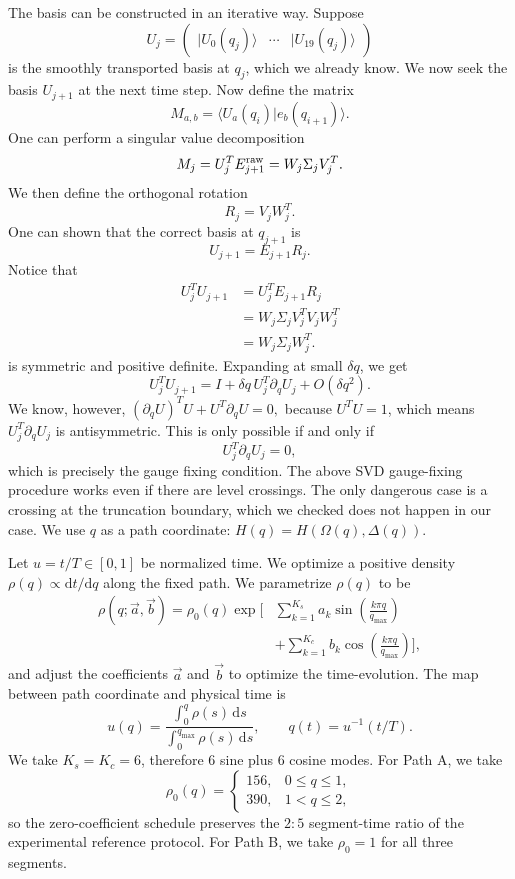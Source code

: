 \documentclass[a4paper,11pt]{article}
\newcommand{\dd}{\mathrm{d}}
\theoremstyle{remark}
\theoremstyle{theorem}
\begin{document}
The basis can be constructed in an iterative way. Suppose \[U_j=
\begin{pmatrix}
|U_0(q_j)\rangle&
\cdots&
|U_{19}(q_j)\rangle
\end{pmatrix}\]
is the smoothly transported basis at $q_j$, which we already know. We now seek the basis $U_{j+1}$ at the next time step. Now define the matrix 
$$
M_{a,b}=\langle U_a (q_{i})| e_b (q_{i+1}) \rangle .
$$
One can perform a singular value decomposition 
$$
M_j=U_j^T E_{j+1}^{\rm raw}=W_j\Sigma_jV_j^T.
$$
We then define the orthogonal rotation
\[
R_j=V_jW_j^T.
\]
One can shown that the correct basis at $q_{j+1}$ is 
\begin{equation}
U_{j+1}=E_{j+1}R_j. 
\end{equation}
Notice that 
\begin{align}
U_j^T U_{j+1} &=U_j^T E_{j+1} R_j  \nonumber \\
&=W_j\Sigma_j V_j^T V_j  W_j^T \nonumber \\
&=W_j\Sigma_jW_j^T. \nonumber
\end{align}
is symmetric and positive definite.
Expanding at small \(\delta q\), we get
\[
U_j^TU_{j+1}
=
I+\delta q\,U_j^T\partial_qU_j
+O(\delta q^2).
\]
We know, however, 
\((\partial_qU)^TU+U^T\partial_qU=0,\)
because $U^TU=1$, which means \(U_j^T\partial_qU_j\) is antisymmetric. 
This is only possible if and only if 
$$
U_j^T\partial_qU_j=0,
$$ 
which is precisely the gauge fixing condition.
The above SVD gauge-fixing procedure works even if there are level crossings. The only dangerous case is a crossing at the truncation boundary, which we checked does not happen in our case.
We use $q$ as a path coordinate: $H(q)=H(\Omega(q),\Delta(q))$. 

Let $u=t/T\in[0,1]$ be normalized time. We optimize a positive density $\rho(q)\propto \dd t/\dd q$ along the fixed path. We parametrize $\rho(q)$ to be 
\begin{equation}
\begin{aligned}
\rho(q; \vec{a}, \vec{b})=\rho_0(q)\exp\!\Bigg[&
\sum_{k=1}^{K_s}a_k\sin\!\left(\frac{k\pi q}{q_{\max}}\right)\\
&+\sum_{k=1}^{K_c}b_k\cos\!\left(\frac{k\pi q}{q_{\max}}\right)
\Bigg],
\end{aligned}
\label{eq:density}
\end{equation}
and adjust the coefficients $\vec{a}$ and $\vec{b}$ to optimize the time-evolution. 
The map between path coordinate and physical time is
\begin{equation}
u(q)=\frac{\int_0^q\rho(s)\,\dd s}
{\int_0^{q_{\max}}\rho(s)\,\dd s},
\qquad q(t)=u^{-1}(t/T).
\label{eq:clock}
\end{equation}
We take $K_s=K_c=6$, therefore 6 sine plus 6 cosine modes. For Path A, we take
\[
\rho_0(q)=
\begin{cases}
156, & 0\leq q\leq1,\\
390, & 1<q\leq2,
\end{cases}
\]
so the zero-coefficient schedule preserves the $2:5$ segment-time
ratio of the experimental reference protocol. For Path B, we take $\rho_0=1$ for all three segments.
\end{document}
